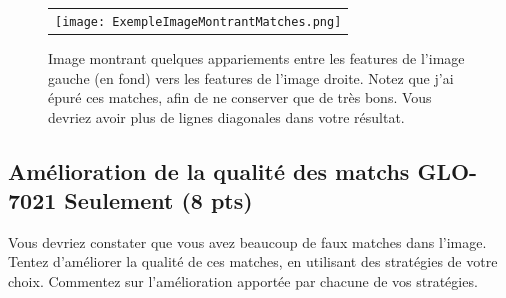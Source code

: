 \documentclass[12pt]{article}
\begin{document}
\begin{figure}[ht]
 \begin{center}
  \begin{tabular}{c}
    \texttt{[image: ExempleImageMontrantMatches.png]}
  \end{tabular}
 \end{center}
\vspace{-0.25in}
 \caption{Image montrant quelques appariements entre les features de l'image gauche (en fond) vers les features de l'image droite. Notez que j'ai épuré ces matches, afin de ne conserver que de très bons. Vous devriez avoir plus de lignes diagonales dans votre résultat.}
 \label{ExempleImageMontrantMatches}
\end{figure}

\subsection{Amélioration de la qualité des matchs GLO-7021 Seulement (8 pts)}
Vous devriez constater que vous avez beaucoup de faux matches dans l'image. Tentez d'améliorer la qualité de ces matches, en utilisant des stratégies de votre choix. Commentez sur l'amélioration apportée par chacune de vos stratégies.
\end{document}
